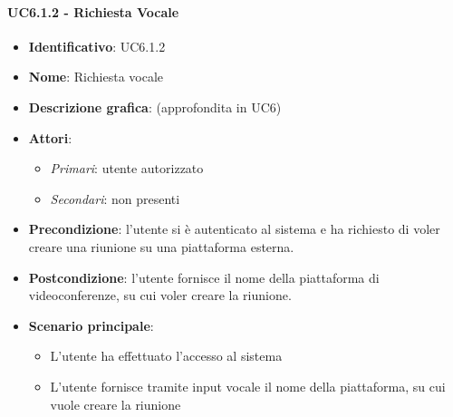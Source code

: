 \paragraph{UC6.1.2 - Richiesta Vocale}
\begin{itemize}
   \item \textbf{Identificativo}: UC6.1.2
   \item \textbf{Nome}: Richiesta vocale
   \item \textbf{Descrizione grafica}: (approfondita in UC6)
   \item \textbf{Attori}:
   \begin{itemize} 
       \item \textit{Primari}: utente autorizzato
       \item \textit{Secondari}: non presenti
   \end{itemize}
       \item \textbf{Precondizione}: l'utente si è autenticato al sistema e ha richiesto di voler creare una riunione su una piattaforma esterna.
       \item \textbf{Postcondizione}: l'utente fornisce il nome della piattaforma di videoconferenze, su cui voler creare la riunione.
    \item \textbf{Scenario principale}: 
       \begin{itemize}
           \item L'utente ha effettuato l'accesso al sistema 
           \item L'utente fornisce tramite input vocale il nome della piattaforma, su cui vuole creare la riunione
       \end{itemize}
\end{itemize}

